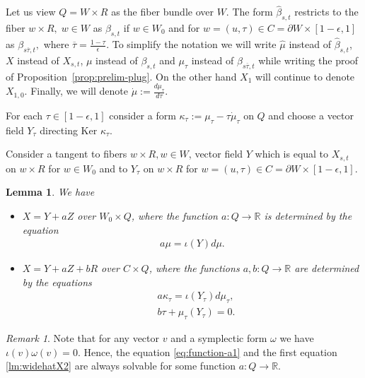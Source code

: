 \documentclass[12pt]{amsart}
\theoremstyle{plain}
\newtheorem{lemma}[theorem]{Lemma}
\theoremstyle{definition}
\theoremstyle{remark}
\newtheorem{remark}[theorem]{Remark}
\newcommand{\R}{\mathbb{R}}
\newcommand{\eps}{\epsilon}
\newcommand{\p}{\partial}
\newcommand{\wh}{\widehat}
\newcommand{\Ker}{\mathrm{Ker\,}}
\newcommand{\ol}{\overline}
\begin{document}
 Let us view  $Q=W\times R$ as the fiber bundle over $W$.
 The form $\wh\beta_{s,t}$ restricts to the fiber $w\times R,\; w\in W$ as $\beta_{s,t}$ if $w\in W_0$ and  for $w=(u,\tau)\in C=\p W\times[1-\eps, 1]$ as $\beta_{s\ol\tau,t},$ where
 $ \ol\tau=\frac{1-\tau}{\eps} $. 
 To simplify the notation we will write $\wh\mu$ instead of $\wh\beta_{s,t}$, $X$ instead of $X_{s,t}$, $\mu$ instead of
 $\beta_{s,t}$ and  $\mu_\tau$ instead of $\beta_{s\ol\tau,t}$ while writing the proof of Proposition~\ref{prop:prelim-plug}. On the other hand
 $X_1$ will continue to denote $X_{1,0}$.  Finally, we will denote
 $\dot\mu:=\frac{d\mu_\tau}{d\tau}$. 
 
For each $\tau\in[1-\eps,1]$ consider a  form  $\kappa_\tau:=\mu_\tau-\tau\dot\mu_\tau$ on $Q$ and choose a vector field $Y_\tau$ directing $\Ker\,\kappa_\tau$.
 
Consider a tangent to fibers $w\times R, w\in W$, vector field $  Y$ which is equal to $X_{s,t}$ on $w\times R$ for $w\in W_0$  and to $Y_\tau$ on $w\times R$  for $w=(u,\tau)\in C=\p W\times[1-\eps, 1]$.

  
 
 \begin{lemma}\label{lm:widehatX}
 We have 
\begin{itemize}
\item[1.] $X= Y+aZ$ over $W_0\times Q$, where the function $a:Q\to\R$ is determined by the equation 
\begin{align}\label{eq:function-a1}
a\mu=\iota(Y)d\mu.
\end{align}
\item[2.] $X=Y+aZ+bR$ over $C\times Q$, where the functions
  $a,b:Q\to\R$ are determined  by the equations
  \begin{equation}\label{lm:widehatX2}
  \begin{split}
 & a\kappa_\tau=\iota(Y_\tau)d\mu_\tau, \\
 & b\tau+\mu_\tau(Y_\tau)=0.
 \end{split}
 \end{equation}
 \end{itemize}
 \end{lemma}
 
\begin{remark}\label{rem:a} Note   that  for any vector $v$ and a  symplectic form $\omega$ we have
 $\iota(v)\omega(v)=0$. Hence,    the equation  \eqref{eq:function-a1}  and the first equation \eqref{lm:widehatX2} are always solvable for some function $a:Q\to\R$.
 \end{remark}
 
\end{document}
